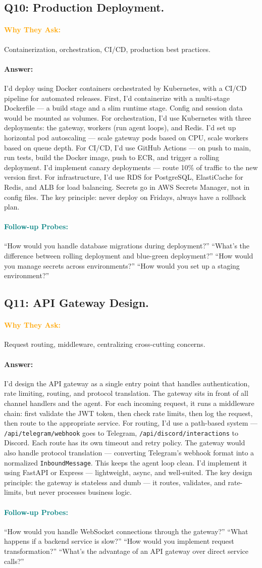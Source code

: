 \documentclass[11pt,a4paper]{article}
\newcommand{\Q}[1]{\subsection{#1}}
\newcommand{\Ans}[1]{\paragraph{\textbf{Answer:}} #1}
\newcommand{\Why}{\paragraph{\textcolor{orange}{\textbf{Why They Ask:}}}}
\newcommand{\Probe}{\paragraph{\textcolor{teal}{\textbf{Follow-up Probes:}}}}
\begin{document}
\Q{Q10: Production Deployment.}
\Why Containerization, orchestration, CI/CD, production best practices.
\Ans I'd deploy using Docker containers orchestrated by Kubernetes, with a CI/CD pipeline for automated releases. First, I'd containerize with a multi-stage Dockerfile --- a build stage and a slim runtime stage. Config and session data would be mounted as volumes. For orchestration, I'd use Kubernetes with three deployments: the gateway, workers (run agent loops), and Redis. I'd set up horizontal pod autoscaling --- scale gateway pods based on CPU, scale workers based on queue depth. For CI/CD, I'd use GitHub Actions --- on push to main, run tests, build the Docker image, push to ECR, and trigger a rolling deployment. I'd implement canary deployments --- route 10\% of traffic to the new version first. For infrastructure, I'd use RDS for PostgreSQL, ElastiCache for Redis, and ALB for load balancing. Secrets go in AWS Secrets Manager, not in config files. The key principle: never deploy on Fridays, always have a rollback plan.
\Probe ``How would you handle database migrations during deployment?'' ``What's the difference between rolling deployment and blue-green deployment?'' ``How would you manage secrets across environments?'' ``How would you set up a staging environment?''

\Q{Q11: API Gateway Design.}
\Why Request routing, middleware, centralizing cross-cutting concerns.
\Ans I'd design the API gateway as a single entry point that handles authentication, rate limiting, routing, and protocol translation. The gateway sits in front of all channel handlers and the agent. For each incoming request, it runs a middleware chain: first validate the JWT token, then check rate limits, then log the request, then route to the appropriate service. For routing, I'd use a path-based system --- \texttt{/api/telegram/webhook} goes to Telegram, \texttt{/api/discord/interactions} to Discord. Each route has its own timeout and retry policy. The gateway would also handle protocol translation --- converting Telegram's webhook format into a normalized \texttt{InboundMessage}. This keeps the agent loop clean. I'd implement it using FastAPI or Express --- lightweight, async, and well-suited. The key design principle: the gateway is stateless and dumb --- it routes, validates, and rate-limits, but never processes business logic.
\Probe ``How would you handle WebSocket connections through the gateway?'' ``What happens if a backend service is slow?'' ``How would you implement request transformation?'' ``What's the advantage of an API gateway over direct service calls?''
\end{document}
